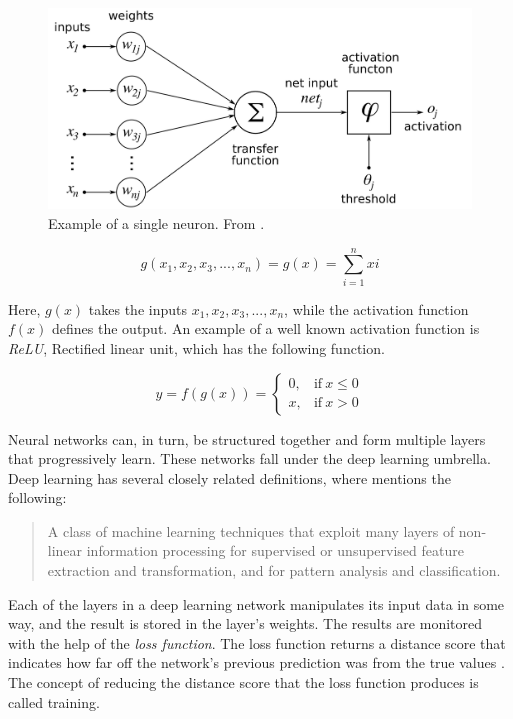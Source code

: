 \documentclass[nofilelist]{cslthse-msc}
\begin{document}
\begin{figure}[htp]
    \centering
    \includegraphics[width=12cm]{msccls/explanatory_images/neuron_new.png}
    \caption{Example of a single neuron. From \citet{wiki:neuron_image}.}
    \label{fig:neuron}
\end{figure}


\begin{equation}
    g(x_1, x_2, x_3,...,x_n) = g(x) = \sum_{i=1}^n  xi
\end{equation}

Here, $g(x)$ takes the inputs $x_1, x_2, x_3,...,x_n$, while the activation function $f(x)$ defines the output. An example of a well known activation function is \textit{ReLU}, Rectified linear unit, which has the following function. 

\begin{equation}
y = f(g(x)) =
\begin{cases}
  0, & \text{if}\ x \leq 0 \\
  x, & \text{if}\ x > 0
\end{cases}
\end{equation}

Neural networks can, in turn, be structured together and form multiple layers that progressively learn. These networks fall under the deep learning umbrella. Deep learning has several closely related definitions, where \citet{deng2014deep} mentions the following:

\begin{quote}{A class of machine learning techniques that exploit many layers of non-linear information processing for supervised or unsupervised feature extraction and transformation, and for pattern analysis and classification.}
\end{quote}

Each of the layers in a deep learning network manipulates its input data in some way, and the result is stored in the layer's weights. The results are monitored with the help of the \textit{loss function}. The loss function returns a distance score that indicates how far off the network's previous prediction was from the true values \citep{franoischollet2017learning}. The concept of reducing the distance score that the loss function produces is called training.
\end{document}
